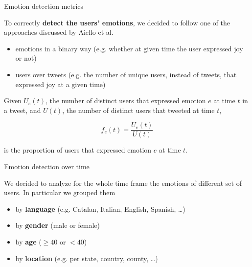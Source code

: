\documentclass[8pt]{beamer}  %
\begin{document}
\begin{frame}{Emotion detection metrics}

    To correctly \textbf{detect the users' emotions}, we decided to follow one of the approaches discussed by Aiello et al.~\autocite{aiello2020epidemic}
	
	\begin{itemize}
    	\item emotions in a binary way (e.g. whether at given time the user expressed joy or not)
    	\item users over tweets (e.g. the number of unique users, instead of tweets, that expressed joy at a given time)
    \end{itemize}
	
    \begin{definition}
    \label{def:user-emotions}
    	Given \(U_e(t)\), the number of distinct users that expressed emotion \(e\) at time \(t\) in a tweet, and \(U(t)\), the number of distinct users that tweeted at time \(t\),
    	
    	\[f_e(t) = \frac{U_e(t)}{U(t)}\]
    	
    	is the proportion of users that expressed emotion \(e\) at time \(t\).	
    \end{definition}

\end{frame}

\begin{frame}{Emotion detection over time}

    We decided to analyze for the whole time frame the emotions of different set of users. In particular we grouped them
    
    \begin{itemize}
        \item by \textbf{language} (e.g. Catalan, Italian, English, Spanish, \ldots)
        \item by \textbf{gender} (male or female)
        \item by \textbf{age} (\(\geq 40\) or \(< 40\))
        \item by \textbf{location} (e.g. per state, country, county, \ldots)
    \end{itemize}

\end{frame}
\end{document}
